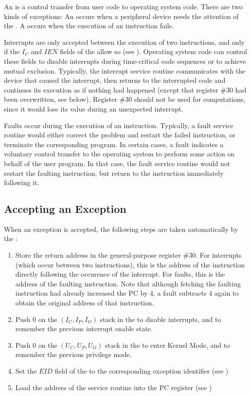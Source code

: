 An  is a control transfer from user code to operating system code. There are two kinds of exceptions: An  occurs when a peripheral device needs the attention of the \ecox. A  occurs when the execution of an instruction fails.

Interrupts are only accepted between the execution of two instructions, and only if the $I_C$ and $IEN$ fields of the \psw allow so (see ). Operating system code can control these fields to disable interrupts during time-critical code sequences or to achieve mutual exclusion. Typically, the interrupt service routine communicates with the device that caused the interrupt, then returns to the interrupted code and continues its execution as if nothing had happened (except that register \#30 had been overwritten, see below). Register \#30 should not be used for computations, since it would lose its value during an unexpected interrupt.

Faults occur during the execution of an instruction. Typically, a fault service routine would either correct the problem and restart the failed instruction, or terminate the corresponding program. In certain cases, a fault indicates a voluntary control transfer to the operating system to perform some action on behalf of the user program. In that case, the fault service routine would not restart the faulting instruction, but return to the instruction immediately following it.

\subsection{Accepting an Exception}

When an exception is accepted, the following steps are taken automatically by the \eco:
\begin{enumerate}
\item Store the return address in the general-purpose register \#30. For interrupts (which occur between two instructions), this is the address of the instruction directly following the occurence of the interrupt. For faults, this is the address of the faulting instruction. Note that although fetching the faulting instruction had already increased
the PC by 4, a fault subtracts 4 again to obtain the original address of that instruction.
\item Push 0 on the $(I_C, I_P, I_O)$ stack in the \psw to disable interrupts, and to remember the previous interrupt enable state.
\item Push 0 on the $(U_C, U_P, U_O)$ stack in the \psw to enter Kernel Mode, and to remember the previous privilege mode.
\item Set the $EID$ field of the \psw to the corresponding exception identifier (see )
\item Load the address of the service routine into the PC register (see )
\end{enumerate}

